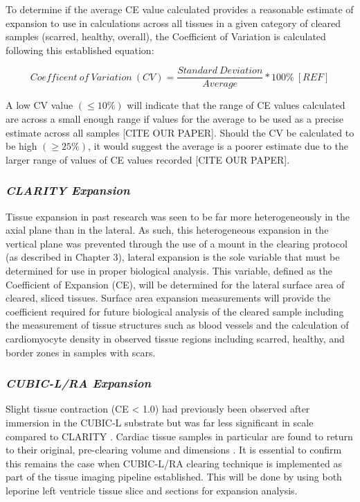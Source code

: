To determine if the average CE value calculated provides a reasonable estimate of expansion to use in calculations across all tissues in a given category of cleared samples (scarred, healthy, overall), the Coefficient of Variation is calculated following this established equation:

\newline
\begin{equation}
Coefficent\ of\ Variation\ (CV) = \frac{Standard\ Deviation}{Average}*100\%\ [REF]
\end{equation}
\medskip

A low CV value $(\leq 10\%)$ will indicate that the range of CE values calculated are across a small enough range if values for the average to be used as a precise estimate across all samples [CITE OUR PAPER]. Should the CV be calculated to be high $(\geq 25\%)$, it would suggest the average is a poorer estimate due to the larger range of values of CE values recorded [CITE OUR PAPER].

\subsubsection{\textit{CLARITY Expansion}} Tissue expansion in past research was seen to be far more heterogeneously in the axial plane than in the lateral. As such, this heterogeneous expansion in the vertical plane was prevented through the use of a mount in the clearing protocol (as described in Chapter 3), lateral expansion is the sole variable that must be determined for use in proper biological analysis. This variable, defined as the Coefficient of Expansion (CE), will be determined for the lateral surface area of cleared, sliced tissues. Surface area expansion measurements will provide the coefficient required for future biological analysis of the cleared sample including the measurement of tissue structures such as blood vessels and the calculation of cardiomyocyte density in observed tissue regions including scarred, healthy, and border zones in samples with scars.

\subsubsection{\textit{CUBIC-L/RA Expansion}} Slight tissue contraction (CE < 1.0) had previously been observed after immersion in the CUBIC-L substrate but was far less significant in scale compared to CLARITY \cite{sands_its_2022}. Cardiac tissue samples in particular are found to return to their original, pre-clearing volume and dimensions \cite{ueda_cubic_nodate}. It is essential to confirm this remains the case when CUBIC-L/RA clearing technique is implemented as part of the tissue imaging pipeline established. This will be done by using both leporine left ventricle tissue slice and sections for expansion analysis. 

